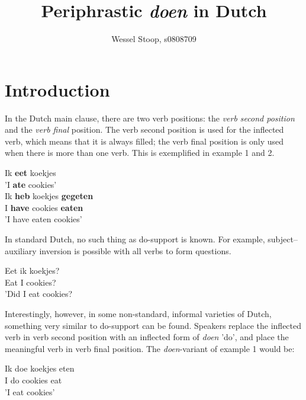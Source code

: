 \documentclass[12pt]{article}
\title{Periphrastic \emph{doen} in Dutch}
\author{Wessel Stoop, s0808709}
\begin{document}
\maketitle

\section{Introduction}
In the Dutch main clause, there are two verb positions: the \emph{verb second position} and the \emph{verb final} position. The verb second position is used for the inflected verb, which means that it is always filled; the verb final position is only used when there is more than one verb. This is exemplified in example 1 and 2.

\begin{exe}
\ex \gll Ik \textbf{eet} koekjes\\
 'I \textbf{ate} cookies'\\

\ex \gll Ik \textbf{heb} koekjes \textbf{gegeten}\\
I \textbf{have} cookies \textbf{eaten}\\
\trans 'I have eaten cookies'
\end{exe}

In standard Dutch, no such thing as do-support is known. For example, subject–auxiliary inversion is possible with all verbs to form questions.

\begin{exe}
\ex \gll Eet ik koekjes? \\
Eat I cookies? \\
\trans 'Did I eat cookies?
\end{exe}

Interestingly, however, in some non-standard, informal varieties of Dutch, something very similar to do-support can be found. Speakers replace the inflected verb in verb second position with an inflected form of \emph{doen} 'do', and place the meaningful verb in verb final position. The \emph{doen}-variant of example 1 would be:

\begin{exe}
\ex \gll Ik doe koekjes eten \\
I do cookies eat\\
\trans 'I eat cookies'
\end{exe}
\end{document}
